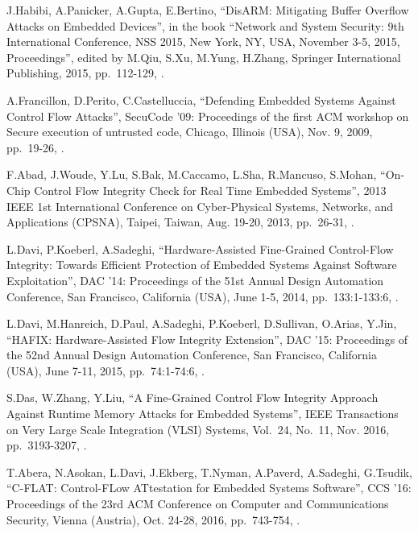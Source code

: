 \begin{thebibliography}{99}
J.Habibi, A.Panicker, A.Gupta, E.Bertino,
``DisARM: Mitigating Buffer Overflow Attacks on Embedded Devices'',
in the book ``Network and System Security: 9th International Conference, NSS 2015, New York, NY, USA, November 3-5, 2015, Proceedings'',
edited by M.Qiu, S.Xu, M.Yung, H.Zhang,
Springer International Publishing, 2015,
pp.\ 112-129,
.

A.Francillon, D.Perito, C.Castelluccia,
``Defending Embedded Systems Against Control Flow Attacks'',
SecuCode '09: Proceedings of the first ACM workshop on Secure execution of untrusted code,
Chicago, Illinois (USA), Nov. 9, 2009,
pp.\ 19-26,
.

F.Abad, J.Woude, Y.Lu, S.Bak, M.Caccamo, L.Sha, R.Mancuso, S.Mohan,
``On-Chip Control Flow Integrity Check for Real Time Embedded Systems'',
2013 IEEE 1st International Conference on Cyber-Physical Systems, Networks, and Applications (CPSNA),
Taipei, Taiwan, Aug. 19-20, 2013,
pp.\ 26-31,
.

L.Davi, P.Koeberl, A.Sadeghi,
``Hardware-Assisted Fine-Grained Control-Flow Integrity: Towards Efficient Protection of Embedded Systems Against Software Exploitation'',
DAC '14: Proceedings of the 51st Annual Design Automation Conference,
San Francisco, California (USA), June 1-5, 2014,
pp.\ 133:1-133:6,
.

L.Davi, M.Hanreich, D.Paul, A.Sadeghi, P.Koeberl, D.Sullivan, O.Arias, Y.Jin,
``HAFIX: Hardware-Assisted Flow Integrity Extension'',
DAC '15: Proceedings of the 52nd Annual Design Automation Conference,
San Francisco, California (USA), June 7-11, 2015,
pp.\ 74:1-74:6,
.

S.Das, W.Zhang, Y.Liu,
``A Fine-Grained Control Flow Integrity Approach Against Runtime Memory Attacks for Embedded Systems'',
IEEE Transactions on Very Large Scale Integration (VLSI) Systems,
Vol.\ 24, No.\ 11,
Nov. 2016,
pp.\ 3193-3207,
.

T.Abera, N.Asokan, L.Davi, J.Ekberg, T.Nyman, A.Paverd, A.Sadeghi, G.Tsudik,
``C-FLAT: Control-FLow ATtestation for Embedded Systems Software'',
CCS '16: Proceedings of the 23rd ACM Conference on Computer and Communications Security,
Vienna (Austria), Oct. 24-28, 2016,
pp.\ 743-754,
.


\end{thebibliography}
